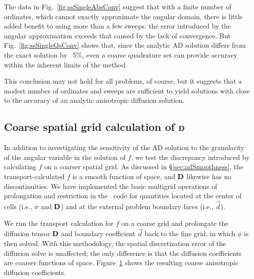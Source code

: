 The data in Fig.~\ref{fig:ssSingleAbsConv} suggest that with a finite number of
ordinates, which cannot exactly
approximate the angular domain, there is little added benefit to using more than
a few sweeps: the error introduced by the angular approximation exceeds that
caused by 
the lack of convergence. But Fig.~\ref{fig:ssSingleQsConv} shows that, since
the analytic AD solution differs from the exact solution by ~5\%, even a
coarse quadrature set can provide accuracy within the inherent limits of the
method.

This conclusion may not hold for all problems, of course, but it suggests that
a modest number of ordinates and sweeps are sufficient to yield solutions with
close to the accuracy of an analytic anisotropic diffusion solution.

\subsection{Coarse spatial grid calculation of \texorpdfstring{$\mathbf{D}$}{D}}
\label{sec:coarseGridAdCoeff}

In addition to investigating the sensitivity of the AD solution to the
granularity of
the angular variable in the solution of $f$, we test the discrepancy
introduced by calculating $f$ on a coarser spatial grid. As discussed in
\S\ref{sec:adSmoothness}, the transport-calculated $f$ is a smooth function of
space, and
$\mathbf{D}$ likewise has no discontinuities. We have implemented the basic
multigrid operations of prolongation and restriction in the \pytrt\ code
\cite{Pytrt}
for quantities located at the center of cells (i.e., $\sigma$ and $\mathbf{D}$) and
at the external problem boundary faces (i.e., $\vec{d}$).

We run the transport calculation for $f$ on a coarse grid and prolongate the
diffusion tensor $\mathbf{D}$ and boundary coefficient $\vec{d}$ back to the fine
grid, in which $\phi$
is then solved. With this methodology, the spatial discretization error of the
diffusion solve is unaffected; the only difference is that the diffusion
coefficients are coarser functions of space. Figure~\ref{fig:ssSingleMgD} shows
the resulting coarse anisotropic diffusion coefficients.

\begin{figure}[htb]
  \centering
{}%
%
  \label{fig:ssSingleMgD}
\end{figure}

